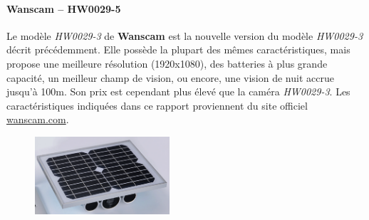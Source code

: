 \paragraph{\textbf{Wanscam} -- HW0029-5}
Le modèle \textit{HW0029-3} de \textbf{Wanscam} est la nouvelle version du modèle \textit{HW0029-3} décrit précédemment. Elle possède la plupart des mêmes caractéristiques, mais propose une meilleure résolution (1920x1080), des batteries à plus grande capacité, un meilleur champ de vision, ou encore, une vision de nuit accrue jusqu'à 100m. Son prix est cependant plus élevé que la caméra \textit{HW0029-3}. Les caractéristiques indiquées dans ce rapport proviennent du site officiel \url{wanscam.com}\autocite{cam:wan5}.

\begin{figure}[ht]
    \includegraphics[width=50mm]{img/conception/wan5_cam.png}
    \centering
\end{figure}

